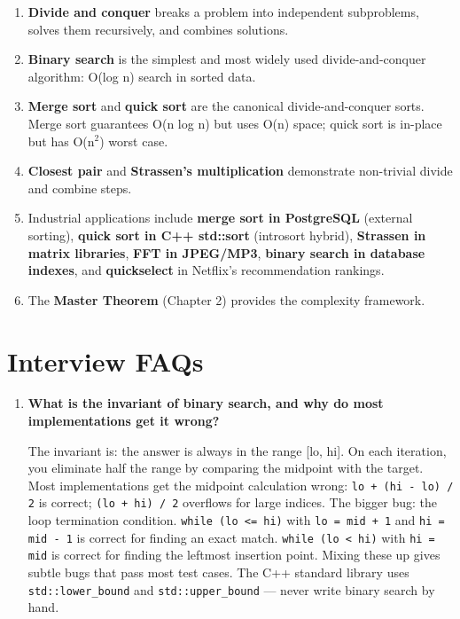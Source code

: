 \begin{enumerate}
\item \textbf{Divide and conquer} breaks a problem into independent subproblems, solves them recursively, and combines solutions.
\item \textbf{Binary search} is the simplest and most widely used divide-and-conquer algorithm: O(log n) search in sorted data.
\item \textbf{Merge sort} and \textbf{quick sort} are the canonical divide-and-conquer sorts. Merge sort guarantees O(n log n) but uses O(n) space; quick sort is in-place but has O(n$^{2}$) worst case.
\item \textbf{Closest pair} and \textbf{Strassen's multiplication} demonstrate non-trivial divide and combine steps.
\item Industrial applications include \textbf{merge sort in PostgreSQL} (external sorting), \textbf{quick sort in C++ std::sort} (introsort hybrid), \textbf{Strassen in matrix libraries}, \textbf{FFT in JPEG/MP3}, \textbf{binary search in database indexes}, and \textbf{quickselect} in Netflix's recommendation rankings.
\item The \textbf{Master Theorem} (Chapter 2) provides the complexity framework.
\end{enumerate}

\section{Interview FAQs}

\begin{enumerate}
\item \textbf{What is the invariant of binary search, and why do most implementations get it wrong?}

The invariant is: the answer is always in the range [lo, hi]. On each iteration, you eliminate half the range by comparing the midpoint with the target. Most implementations get the midpoint calculation wrong: \texttt{lo + (hi - lo) / 2} is correct; \texttt{(lo + hi) / 2} overflows for large indices. The bigger bug: the loop termination condition. \texttt{while (lo <= hi)} with \texttt{lo = mid + 1} and \texttt{hi = mid - 1} is correct for finding an exact match. \texttt{while (lo < hi)} with \texttt{hi = mid} is correct for finding the leftmost insertion point. Mixing these up gives subtle bugs that pass most test cases. The C++ standard library uses \texttt{std::lower\_bound} and \texttt{std::upper\_bound} --- never write binary search by hand.
\end{enumerate}

